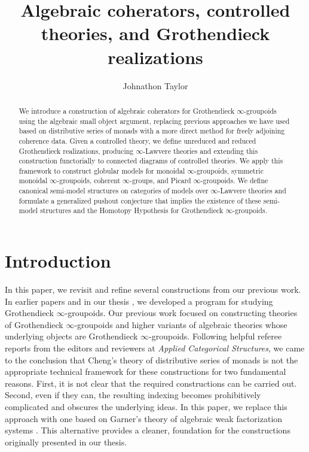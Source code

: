 \documentclass{tac}
\title{Algebraic coherators, controlled theories, and Grothendieck realizations}
\author{Johnathon Taylor}
\begin{document}
\maketitle

\begin{abstract}
We introduce a construction of algebraic coherators for Grothendieck $\infty$-groupoids using the algebraic small object argument, replacing previous approaches we have used based on distributive series of monads with a more direct method for freely adjoining coherence data. Given a controlled theory, we define unreduced and reduced Grothendieck realizations, producing $\infty$-Lawvere theories and extending this construction functorially to connected diagrams of controlled theories. We apply this framework to construct globular models for monoidal $\infty$-groupoids, symmetric monoidal $\infty$-groupoids, coherent $\infty$-groups, and Picard $\infty$-groupoids. We define canonical semi-model structures on categories of models over $\infty$-Lawvere theories and formulate a generalized pushout conjecture that implies the existence of these semi-model structures and the Homotopy Hypothesis for Grothendieck $\infty$-groupoids.
\end{abstract}





\tableofcontents

\section{Introduction}
In this paper, we revisit and refine several constructions from our previous work. In earlier papers and in our thesis \cite{Taylor2026}, we developed a program for studying Grothendieck $\infty$-groupoids. Our previous work focused on constructing theories of Grothendieck $\infty$-groupoids and higher variants of algebraic theories whose underlying objects are Grothendieck $\infty$-groupoids. Following helpful referee reports from the editors and reviewers at \emph{Applied Categorical Structures}, we came to the conclusion that Cheng's theory of distributive series of monads \cite{Cheng2011} is not the appropriate technical framework for these constructions for two fundamental reasons. First, it is not clear that the required constructions can be carried out. Second, even if they can, the resulting indexing becomes prohibitively complicated and obscures the underlying ideas. In this paper, we replace this approach with one based on Garner's theory of algebraic weak factorization systems \cite{Garner2009}. This alternative provides a cleaner, foundation for the constructions originally presented in our thesis.
\end{document}
